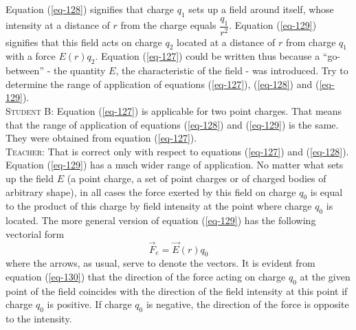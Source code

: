 \documentclass[a4paper,sfsidenotes]{tufte-book}
\begin{document}
 Equation (\ref{eq-128}) signifies that charge $q_{1}$ sets up a field around itself, whose intensity at a distance of $r$ from the charge equals $\dfrac{q_{1}}{r^{2}}$. Equation (\ref{eq-129}) signifies that this field acts on charge $q_{2}$ located at a distance of $r$ from charge $q_{1}$ with a force $E(r) q_{2}$. Equation (\ref{eq-127}) could be written thus because a ``go-between'' - the quantity $E$, the characteristic of the field - was introduced. Try to determine the range of application of equations (\ref{eq-127}), (\ref{eq-128}) and (\ref{eq-129}).
\\
\textsc{Student B:} Equation (\ref{eq-127}) is applicable for two point charges. That means that the range of application of equations (\ref{eq-128}) and (\ref{eq-129}) is the same. They were obtained from equation (\ref{eq-127}).
\\
\textsc{Teacher:} That is correct only with respect to equations (\ref{eq-127}) and (\ref{eq-128}). Equation (\ref{eq-129}) has a much wider range of application. No matter what sets up the field $E$ (a point charge, a set of point charges or of charged bodies of arbitrary shape), in all cases the force exerted by this field on charge $q_{0}$ is equal to the product of this charge by field intensity at the point where charge $q_{0}$ is located. The more general version of equation (\ref{eq-129}) has the following vectorial form
\begin{equation}%
\vec{F}_{e} = \vec{E}(r) q_{0}
\label{eq-130}
\end{equation}
where the arrows, as usual, serve to denote the vectors. It is evident from equation (\ref{eq-130}) that the direction of the force acting on charge $q_{0}$ at the given point of the field coincides with the direction of the field intensity at this point if charge $q_{0}$ is positive. If charge $q_{0}$ is negative, the direction of the force is opposite to the intensity. 
\end{document}
